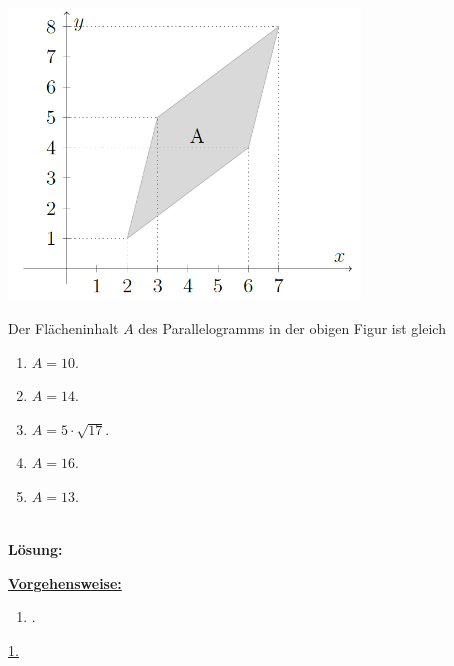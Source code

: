 \subsection*{}
\begin{center}
	\includegraphics[width=0.7\textwidth]{pictures/aufgabe2_7}
\end{center}
Der Flächeninhalt $ A $ des Parallelogramms in der obigen Figur ist gleich
\renewcommand{\labelenumi}{(\alph{enumi})}
\begin{enumerate}
	\item 
	$ A = 10 $.
	\item
	$ A = 14 $.
	\item
	$ A = 5 \cdot  \sqrt{17} $.
	\item
	$ A = 16 $.
	\item
	$ A = 13 $.
\end{enumerate}
\ \\
\textbf{Lösung:}
\begin{mdframed}
\underline{\textbf{Vorgehensweise:}}
\renewcommand{\labelenumi}{\theenumi.}
\begin{enumerate}
\item .
\end{enumerate}
\end{mdframed}

\underline{1. }\\

\newpage

